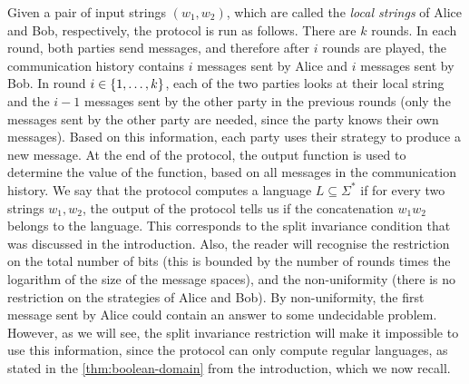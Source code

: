 Given a pair of input strings $(w_1,w_2)$, which are called the \emph{local strings} of Alice and Bob, respectively, the  protocol is run as follows. There are $k$ rounds. In each round, both parties send messages, and therefore after $i$ rounds are played, the communication history contains $i$ messages sent by Alice and $i$ messages sent by Bob.  In round  $i \in \{1,\ldots,k\}$,  each of the two parties  looks at their local string and the $i-1$ messages sent by the other party in the previous rounds (only the messages sent by the other party are needed, since the party knows their own messages). Based on this information, each party uses their strategy to produce a new message. At the end of the protocol, the output function is used to determine the value of the function, based on all messages in  the communication history. We say that the protocol computes a language $L \subseteq \Sigma^*$ if for every two strings $w_1,w_2$, the output of the protocol tells us if the concatenation $w_1w_2$ belongs to the language. This corresponds to the split invariance condition that was discussed in the introduction.  Also, the reader will recognise the restriction on the total number of bits (this is bounded by the number of rounds times the logarithm of the size of the message spaces), and the non-uniformity (there is no restriction on the strategies of Alice and Bob). By non-uniformity, the first message sent by Alice could contain an answer to some undecidable problem. However, as we will see, the split invariance restriction will make it impossible to use this information, since the protocol can only compute regular languages, as stated in the \cref{thm:boolean-domain} from the introduction, which we now recall.


\booleandomain*




